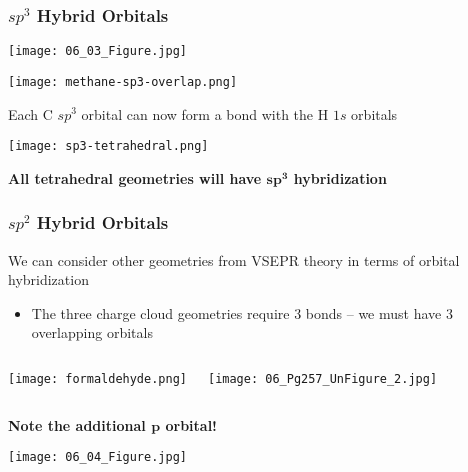 \documentclass[handout]{beamer}
\begin{document}
\begin{frame}[allowframebreaks]
	\frametitle{$sp^3$ Hybrid Orbitals}

	\begin{center}
		\texttt{[image: 06\_03\_Figure.jpg]}
	\end{center}

	\framebreak

	\begin{center}
		\texttt{[image: methane-sp3-overlap.png]}
		
	\end{center}

	Each C $sp^3$ orbital can now form a \textsigma{} bond with the H $1s$
	orbitals

	\framebreak

	\begin{center}
		\texttt{[image: sp3-tetrahedral.png]}
	\end{center}
	
	\bigskip
	
	\begin{center}
		\bfseries
		All tetrahedral geometries will have $\boldsymbol{sp^3}$
		hybridization
	\end{center}
\end{frame}

\begin{frame}[allowframebreaks]
	\frametitle{$sp^2$ Hybrid Orbitals}

	We can consider other geometries from VSEPR theory in
	terms of orbital hybridization
	
	\begin{itemize}
		\item The three charge cloud geometries require \alert{3} bonds
			-- we must have \alert{3} overlapping orbitals
	\end{itemize}
	
	\begin{columns}[c]
		\begin{center}
			\texttt{[image: formaldehyde.png]}
		\end{center}
		\begin{center}
			\texttt{[image: 06\_Pg257\_UnFigure\_2.jpg]}
		\end{center}
	\end{columns}
	
	\begin{center}
		\bfseries
		Note the additional $\boldsymbol{p}$ orbital!
	\end{center}

	\framebreak

	\begin{center}
		\texttt{[image: 06\_04\_Figure.jpg]}
	\end{center}
\end{frame}
\end{document}
